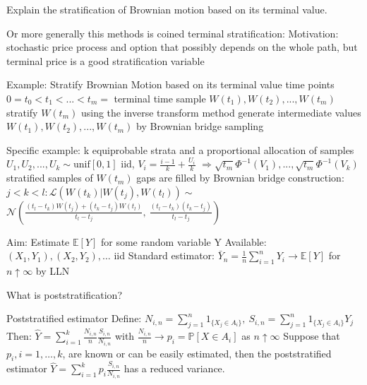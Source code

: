 Explain the stratification of Brownian motion based on its terminal value.

Or more generally this methods is coined terminal stratification:
Motivation: stochastic price process and option that possibly depends on the whole path, 
but terminal price is a good stratification variable

Example: Stratify Brownian Motion based on its terminal value
time points \(0 = t_0 < t_1 < ... < t_m = \) terminal time
sample \(W(t_1), W(t_2), ..., W(t_m)\)
   stratify \(W(t_m)\) using the inverse transform method
   generate intermediate values \(W(t_1), W(t_2), ..., W(t_m)\) by Brownian bridge sampling

Specific example: k equiprobable strata and a proportional allocation of samples
\(U_1, U_2, ..., U_k \sim \text{unif}[0, 1]\) iid, \(V_i = \frac{i-1}{k} + \frac{U_i}{k}\)
\(\Rightarrow \sqrt{t_m} \Phi^{-1}(V_1), ..., \sqrt{t_m} \Phi^{-1}(V_k)\) stratified samples of \(W(t_m)\)
   gaps are filled by Brownian bridge construction:
\(j < k < l: \mathcal{L}(W(t_k) | W(t_j), W(t_l)) \sim\)
\(\mathcal{N} \left( \frac{(t_l - t_k) W(t_j) + (t_k - t_j) W(t_l)}{t_l - t_j},\ \frac{(t_l - t_k)(t_k - t_j)}{t_l - t_j} \right) \)

Aim: Estimate \(\mathbb{E}[Y]\) for some random variable Y
Available: \((X_1, Y_1), (X_2, Y_2), \dots\) iid
Standard estimator: \(\bar{Y}_n = \frac{1}{n} \sum_{i=1}^n Y_i \rightarrow \mathbb{E}[Y]\) for \(n \uparrow \infty\) by LLN

What is poststratification?

Poststratified estimator
Define:
\(N_{i,n} = \sum_{j=1}^n 1_{\{X_j \in A_i\}}, \ S_{i,n} = \sum_{j=1}^n 1_{\{X_j \in A_i\}} Y_j\)
Then: \(\hat{Y} = \sum_{i=1}^k \frac{N_{i,n}}{n} \frac{S_{i,n}}{N_{i,n}}\) with \(\frac{N_{i,n}}{n} \rightarrow p_i = \mathbb{P}[X \in A_i]\) as \(n \uparrow \infty\)
Suppose that \(p_i, i = 1, \dots, k\), are known or can be easily estimated, then the poststratified estimator 
\(\hat{Y} = \sum_{i=1}^k p_i \frac{S_{i,n}}{N_{i,n}}\) 
has a reduced variance.
